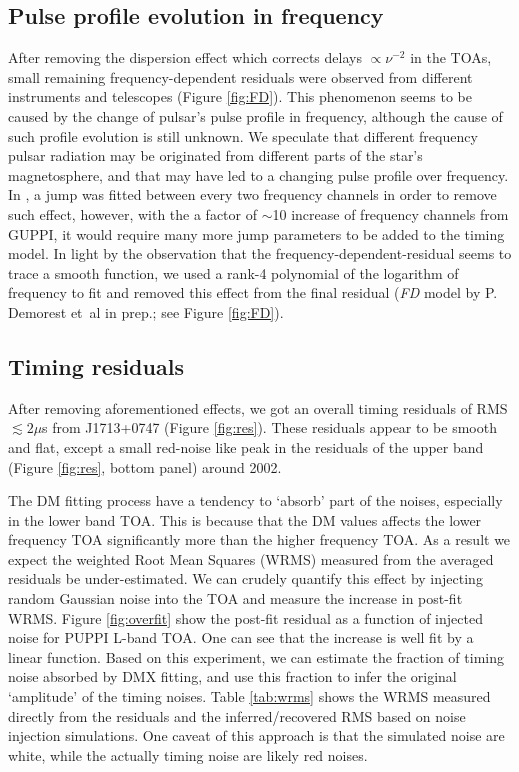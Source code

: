 \subsection{Pulse profile evolution in frequency}
\label{sec:FD}
After removing the dispersion effect which corrects delays $\propto \nu^{-2}$
in the TOAs, small remaining frequency-dependent residuals were observed from
different instruments and telescopes (Figure \ref{fig:FD}).  
This phenomenon seems to be caused by the change of pulsar's pulse profile in
frequency, although the cause of such profile evolution is still unknown.
We speculate that different frequency pulsar radiation may be originated from
different parts of the star's magnetosphere, and that may have led to a
changing pulse profile over frequency.
In \citet{sns+05}, a jump was fitted between every two frequency channels in
order to remove such effect, however, with the a factor of $\sim$10 increase
of frequency channels from GUPPI, it would require many more jump parameters
to be added to the timing model.
In light by the observation that the frequency-dependent-residual seems to
trace a smooth function, we used a rank-4 polynomial of the logarithm of
frequency to fit and removed this effect from the final residual ({\it FD}
model by P. Demorest et~al in prep.; see Figure \ref{fig:FD}). 



\subsection{Timing residuals}
\label{sec:res}

After removing aforementioned effects, we got an overall timing residuals of RMS $\lesssim 2\mu$s from J1713+0747 (Figure \ref{fig:res}).
These residuals appear to be smooth and flat, except a small red-noise like
peak in the residuals of the upper band (Figure \ref{fig:res}, bottom panel) around 2002. 

The DM fitting process have a tendency to
`absorb' part of the noises, especially in the lower band TOA. This is because
that the DM values affects the lower frequency TOA significantly more than the
higher frequency TOA. 
As a result we expect the weighted Root Mean Squares (WRMS) measured from the
averaged residuals be under-estimated. We can crudely quantify
this effect by injecting random Gaussian noise into the TOA and
measure the increase in post-fit WRMS. Figure \ref{fig:overfit} show
the post-fit residual as a function of injected noise for PUPPI L-band TOA. 
One can see that the increase is well fit by a linear function. 
Based on this experiment, we
can estimate the fraction of timing noise absorbed by DMX fitting, and use
this fraction to infer the original `amplitude' of the timing noises. 
Table \ref{tab:wrms} shows the WRMS measured directly from the residuals and 
the inferred/recovered RMS based on noise injection simulations. One caveat 
of this approach is that the simulated noise are white, while the actually timing
noise are likely red noises. 


